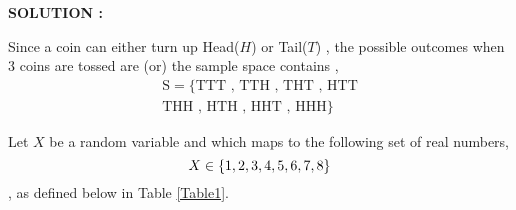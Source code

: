 \documentclass[journal,12pt,twocolumn]{IEEEtran}
\begin{document}
\textbf{SOLUTION :}

Since a coin can either turn up Head($ H$) or Tail($T$) , the possible outcomes when 3 coins are tossed are (or) the sample space contains ,
\begin{multline}
	\text{S} = \{ \text{TTT , TTH , THT , HTT} \\
	       \text{THH , HTH , HHT , HHH}\}
\end{multline}

Let $X$ be a random variable and which maps to the following set of real numbers,
$$X \in \left\{1,2,3,4,5,6,7,8\right\}$$ ,
as defined below in Table \ref{Table1}.

\begin{table}[ht!]
    
    \caption{}
    \label{Table1}
\end{table}
\end{document}
